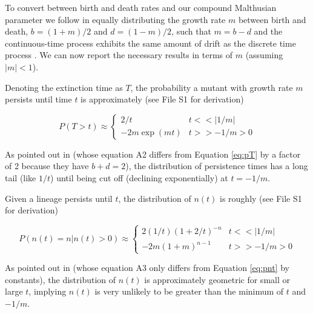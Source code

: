 \documentclass[9pt,twocolumn,twoside,lineno]{gsajnl}
\begin{document}
To convert between birth and death rates and our compound Malthusian parameter we follow \cite{Uecker2016} in equally distributing the growth rate $m$ between birth and death, $b = (1+m)/2$ and $d=(1-m)/2$, such that $m=b-d$ and the continuous-time process exhibits the same amount of drift as the discrete time process \citep[and matches discrete-time simulations well;][]{Uecker2014}.
We can now report the necessary results in terms of $m$ (assuming $|m|<1$).

Denoting the extinction time as $T$, the probability a mutant with growth rate $m$ persists until time $t$ is approximately (see File S1 for derivation)

\begin{equation}\label{eq:pT}
P( T > t ) \approx 
\begin{cases}
	2 / t & t << |1/m| \\
	-2 m \exp(m t) & t >> -1/m > 0
\end{cases}
\end{equation}

\noindent As pointed out in \cite{Weissman2010} (whose equation A2 differs from Equation \ref{eq:pT} by a factor of 2 because they have $b+d=2$), the distribution of persistence times has a long tail (like $1/t$) until being cut off (declining exponentially) at $t=-1/m$.

Given a lineage persists until $t$, the distribution of $n(t)$ is roughly (see File S1 for derivation)

\begin{equation}\label{eq:pnt}
P( n(t) = n | n(t) > 0 ) \approx 
\begin{cases}
	2 (1/t) (1 + 2/t)^{-n} & t << |1/m| \\
	-2 m (1 + m)^{n-1} & t >> -1/m > 0
\end{cases}
\end{equation}

\noindent As pointed out in \cite{Weissman2010} (whose equation A3 only differs from Equation \ref{eq:pnt} by constants), the distribution of $n(t)$ is approximately geometric for small or large $t$, implying $n(t)$ is very unlikely to be greater than the minimum of $t$ and $-1/m$.

\setcounter{figure}{0}
\renewcommand{\thefigure}{S\arabic{figure}}
\setcounter{table}{0}
\renewcommand{\thetable}{S\arabic{table}}
\end{document}

